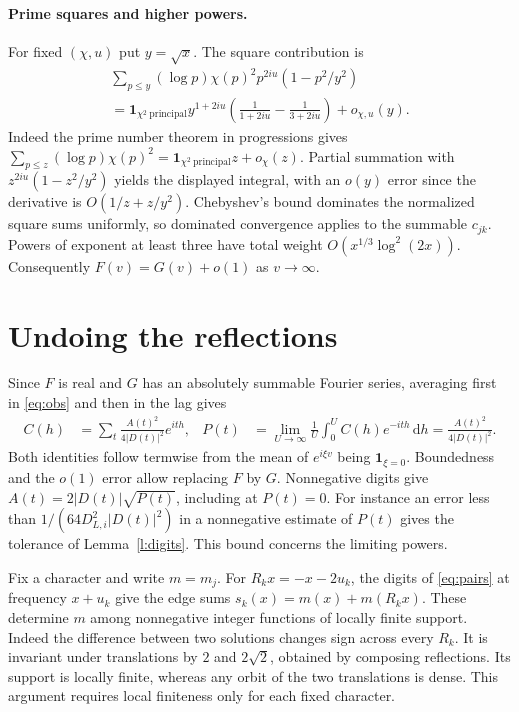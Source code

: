 \documentclass[11pt]{article}
\newcommand{\dd}{\,\mathrm d}
\begin{document}
\paragraph{Prime squares and higher powers.}
For fixed $(\chi,u)$ put $y=\sqrt x$. The square contribution is
\begin{multline*}
 \sum_{p\le y}(\log p)\chi(p)^2p^{2iu}(1-p^2/y^2)\\
 =\mathbf1_{\chi^2\ \mathrm{principal}} y^{1+2iu}
 \left(\frac1{1+2iu}-\frac1{3+2iu}\right)+o_{\chi,u}(y).
\end{multline*}
Indeed the prime number theorem in progressions gives
$\sum_{p\le z}(\log p)\chi(p)^2=\mathbf1_{\chi^2\ \mathrm{principal}}z+o_\chi(z)$. Partial summation with $z^{2iu}(1-z^2/y^2)$ yields the displayed integral, with an $o(y)$ error since the derivative is $O(1/z+z/y^2)$. Chebyshev's bound dominates the normalized square sums uniformly, so dominated convergence applies to the summable $c_{jk}$. Powers of exponent at least three have total weight $O(x^{1/3}\log^2(2x))$. Consequently $F(v)=G(v)+o(1)$ as $v\to\infty$.

\section{Undoing the reflections}

Since $F$ is real and $G$ has an absolutely summable Fourier series, averaging first in \eqref{eq:obs} and then in the lag gives
\begin{align*}
 C(h)&=\sum_t \frac{A(t)^2}{4|D(t)|^2}e^{ith},&
 P(t)&=\lim_{U\to\infty}\frac1U\int_0^U C(h)e^{-ith}\dd h=\frac{A(t)^2}{4|D(t)|^2}.
\end{align*}
Both identities follow termwise from the mean of $e^{i\xi v}$ being $\mathbf1_{\xi=0}$. Boundedness and the $o(1)$ error allow replacing $F$ by $G$. Nonnegative digits give $A(t)=2|D(t)|\sqrt{P(t)}$, including at $P(t)=0$. For instance an error less than $1/(64 D_{L,i}^2|D(t)|^2)$ in a nonnegative estimate of $P(t)$ gives the tolerance of Lemma~\ref{l:digits}. This bound concerns the limiting powers.

Fix a character and write $m=m_j$. For $R_k x=-x-2u_k$, the digits of \eqref{eq:pairs} at frequency $x+u_k$ give the edge sums $s_k(x)=m(x)+m(R_kx)$. These determine $m$ among nonnegative integer functions of locally finite support. Indeed the difference between two solutions changes sign across every $R_k$. It is invariant under translations by $2$ and $2\sqrt2$, obtained by composing reflections. Its support is locally finite, whereas any orbit of the two translations is dense. This argument requires local finiteness only for each fixed character.
\end{document}
